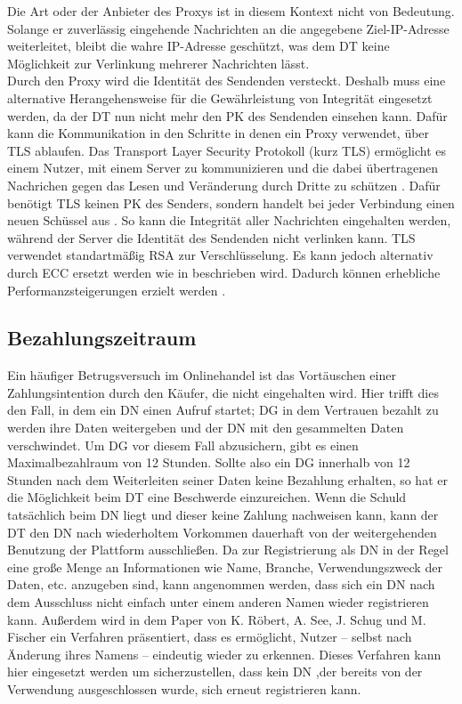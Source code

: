 \documentclass[
	fontsize=11pt,
	headings=small,
	parskip=half,           %
	bibliography=totoc,
	numbers=noenddot,       %
	open=any,               %
]{scrreprt}
\begin{document}
Die Art oder der Anbieter des Proxys ist in diesem Kontext nicht von Bedeutung. Solange er zuverlässig eingehende Nachrichten an die angegebene Ziel-IP-Adresse weiterleitet, bleibt die wahre IP-Adresse geschützt, was dem DT keine Möglichkeit zur Verlinkung mehrerer Nachrichten lässt.\\

Durch den Proxy wird die Identität des Sendenden versteckt. Deshalb muss eine alternative Herangehensweise für die Gewährleistung von Integrität eingesetzt werden, da der DT nun nicht mehr den PK des Sendenden einsehen kann. Dafür kann die Kommunikation in den Schritte in denen ein Proxy verwendet, über TLS ablaufen. Das Transport Layer Security Protokoll (kurz TLS) ermöglicht es einem Nutzer, mit einem Server zu kommunizieren und die dabei übertragenen Nachrichen gegen das Lesen und Veränderung durch Dritte zu schützen \cite{tls-brumbaughssl}. Dafür benötigt TLS keinen PK des Senders, sondern handelt bei jeder Verbindung einen neuen Schüssel aus \cite{tls-Arfaoui2019The}. So kann die Integrität aller Nachrichten eingehalten werden, während der Server die Identität des Sendenden nicht verlinken kann. TLS verwendet standartmäßig RSA zur Verschlüsselung. Es kann jedoch alternativ durch ECC ersetzt werden wie in \cite{tls-ecc-blake2006elliptic} beschrieben wird. Dadurch können erhebliche Performanzsteigerungen erzielt werden \cite{tls-ecc-koschuch2012price}.

\subsection{Bezahlungszeitraum}
\label{subsec:paymentTimespan}
Ein häufiger Betrugsversuch im Onlinehandel ist das Vortäuschen einer Zahlungsintention durch den Käufer, die nicht eingehalten wird. Hier trifft dies den Fall, in dem ein DN einen Aufruf startet; DG in dem Vertrauen bezahlt zu werden ihre Daten weitergeben und der DN mit den gesammelten Daten verschwindet. Um DG vor diesem Fall abzusichern, gibt es einen Maximalbezahlraum von 12 Stunden. Sollte also ein DG innerhalb von 12 Stunden nach dem Weiterleiten seiner Daten keine Bezahlung erhalten, so hat er die Möglichkeit beim DT eine Beschwerde einzureichen. Wenn die Schuld tatsächlich beim DN liegt und dieser keine Zahlung nachweisen kann, kann der DT den DN nach wiederholtem Vorkommen dauerhaft von der weitergehenden Benutzung der Plattform ausschließen. Da zur Registrierung als DN in der Regel eine große Menge an Informationen wie Name, Branche, Verwendungszweck der Daten, etc. anzugeben sind, kann angenommen werden, dass sich ein DN nach dem Ausschluss nicht einfach unter einem anderen Namen wieder registrieren kann. Außerdem wird in dem Paper \cite{roebert2024unlinkable} von K. Röbert, A. See, J. Schug und M. Fischer ein Verfahren präsentiert, dass es ermöglicht, Nutzer -- selbst nach Änderung ihres Namens -- eindeutig wieder zu erkennen. Dieses Verfahren kann hier eingesetzt werden um sicherzustellen, dass kein DN ,der bereits von der Verwendung ausgeschlossen wurde, sich erneut registrieren kann.\\
\end{document}
